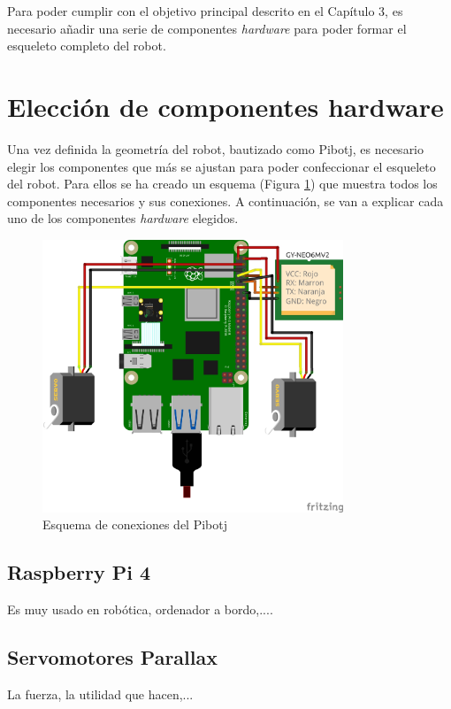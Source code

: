 Para poder cumplir con el objetivo principal descrito en el Capítulo 3, es necesario añadir una serie de componentes \textit{hardware} para poder formar el esqueleto completo del robot.

\section{Elección de componentes hardware}

Una vez definida la geometría del robot, bautizado como Pibotj, es necesario elegir los componentes que más se ajustan para poder confeccionar el esqueleto del robot. Para ellos se ha creado un esquema (Figura \ref{fig:fritzzing}) que muestra todos los componentes necesarios y sus conexiones. A continuación, se van a explicar cada uno de los componentes \textit{hardware} elegidos.  

\begin{figure} [h!]
	\begin{center}
		\includegraphics[width=9cm]{figs/cap5/modelocompleto_bb.jpg}
	\end{center}
	\caption{Esquema de conexiones del Pibotj} 
	\label{fig:fritzzing}
\end{figure}


\subsection{Raspberry Pi 4}

Es muy usado en robótica, ordenador a bordo,....



\subsection{Servomotores Parallax}
La fuerza, la utilidad que hacen,...


